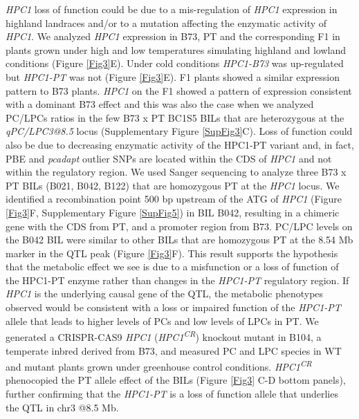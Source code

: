 \documentclass[9pt,twocolumn,twoside,lineno]{BioRxiv}
\begin{document}
\textit{HPC1} loss of function could be due to a mis-regulation of \textit{HPC1} expression in highland landraces and/or to a mutation affecting the enzymatic activity of \textit{HPC1}. 
We analyzed \textit{HPC1} expression in B73, PT and the corresponding F1 in plants grown under high and low temperatures simulating highland and lowland conditions (Figure \ref{Fig3}E). 
Under cold conditions \textit{HPC1-B73} was up-regulated but \textit{HPC1-PT} was not (Figure \ref{Fig3}E). 
F1 plants showed a similar expression pattern to B73 plants.
\textit{HPC1} on the F1 showed a pattern of expression consistent with a dominant B73 effect and this was also the case when we analyzed PC/LPCs ratios in the few B73 x PT BC1S5 BILs that are heterozygous at the \textit{qPC/LPC3@8.5} locus (Supplementary Figure \ref{SupFig3}C).
Loss of function could also be due to decreasing enzymatic activity of the HPC1-PT variant and, in fact, PBE and \textit{pcadapt} outlier SNPs are located within the CDS of \textit{HPC1} and not within the regulatory region. 
We used Sanger sequencing to analyze three B73 x PT BILs (B021, B042, B122) that are homozygous PT at the \textit{HPC1} locus.
We identified a recombination point 500 bp upstream of the ATG of \textit{HPC1} (Figure \ref{Fig3}F, Supplementary Figure \ref{SupFig5}) in BIL B042, resulting in a chimeric gene with the CDS from PT, and a promoter region from B73.
PC/LPC levels on the B042 BIL were similar to other BILs that are homozygous PT at the 8.54 Mb marker in the QTL peak (Figure \ref{Fig3}F). 
This result supports the hypothesis that the metabolic effect we see is due to a misfunction or a loss of function of the HPC1-PT enzyme rather than changes in the \textit{HPC1-PT} regulatory region.
If \textit{HPC1} is the underlying causal gene of the QTL, the metabolic phenotypes observed would be consistent with a loss or impaired function of the \textit{HPC1-PT} allele that leads to higher levels of PCs and low levels of LPCs in PT. 
We generated a CRISPR-CAS9 \textit{HPC1} (\textit{HPC1\textsuperscript{CR}}) knockout mutant in B104, a temperate inbred derived from B73, and measured PC and LPC species in WT and mutant plants grown under greenhouse control conditions. 
\textit{HPC1\textsuperscript{CR}} phenocopied the PT allele effect of the BILs (Figure \ref{Fig3} C-D bottom panels), further confirming that the \textit{HPC1-PT} is a loss of function allele that underlies the QTL in chr3 @8.5 Mb. 
\end{document}
